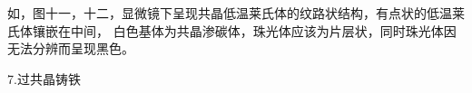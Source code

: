 \documentclass[a4paper,utf8]{article}
\begin{document}
如，图十一，十二，显微镜下呈现共晶低温莱氏体的纹路状结构，有点状的低温莱氏体镶嵌在中间，
白色基体为共晶渗碳体，珠光体应该为片层状，同时珠光体因无法分辨而呈现黑色。
\begin{figure}[!ht]
    \begin{floatrow}
            
    \end{floatrow}

\end{figure}

\newpage
7.过共晶铸铁
\end{document}
